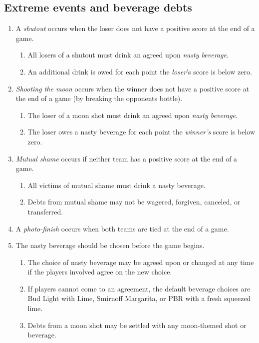 \documentclass[11pt,letterpaper,twocolumn,english,DIV=calc]{scrartcl}
\begin{document}
\subsection{Extreme events and beverage debts}
\begin{enumerate}[leftmargin=2.8em, label=\thesubsection.\arabic*]
	\item A \emph{shutout} occurs when the loser does not have a positive score at the end of a game.

	\begin{enumerate}
		\item All losers of a shutout must drink an agreed upon \emph{nasty beverage}.
		\item An additional drink is owed for each point the \emph{loser}'s score is below zero.
	\end{enumerate}

	\item \emph{Shooting the moon} occurs when the winner does not have a positive score at the end of a game (by breaking the opponents bottle).

	\begin{enumerate}
		\item The loser of a moon shot must drink an agreed upon \emph{nasty beverage}.
		\item The loser owes a nasty beverage for each point the \emph{winner's} score is below zero.
	\end{enumerate}

	\item \emph{Mutual shame} occurs if neither team has a positive score at the end of a game.

	\begin{enumerate}
		\item All victims of mutual shame must drink a nasty beverage.
		\item Debts from mutual shame may not be wagered, forgiven, canceled, or transferred.
	\end{enumerate}

	\item A \emph{photo-finish} occurs when both teams are tied at the end of a game.
	\item The nasty beverage should be chosen before the game begins.

	\begin{enumerate}
		\item The choice of nasty beverage may be agreed upon or changed at any time if the players involved agree on the new choice.
		\item If players cannot come to an agreement, the default beverage choices are Bud Light with Lime, Smirnoff Margarita, or PBR with a fresh squeezed lime.
		\item Debts from a moon shot may be settled with any moon-themed shot or beverage.
	\end{enumerate}


\end{enumerate}
\end{document}
